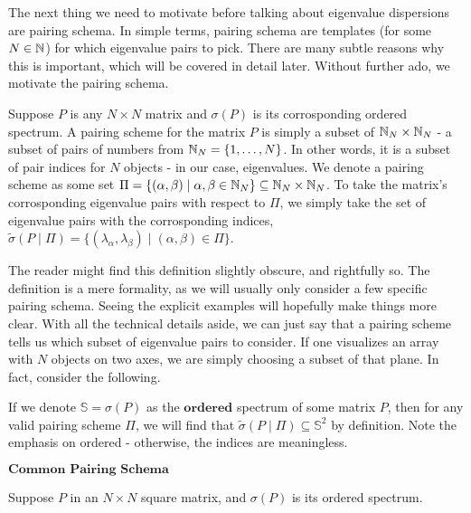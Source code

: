 The next thing we need to motivate before talking about eigenvalue dispersions are pairing schema. In simple terms, pairing schema are templates (for some $N \in \mathbb{N}$) for which eigenvalue pairs to pick. There are many subtle reasons why this is important, which will be covered in detail later. Without further ado, we motivate the pairing schema. 

\begin{definition}
Suppose $P$ is any $N \times N$ matrix and $\sigma(P)$ is its corrosponding ordered spectrum. A pairing scheme for the matrix $P$ is simply a subset of $\mathbb{N}_N \times \mathbb{N}_N$ - a subset of pairs of numbers from $\mathbb{N}_N = \{1, \dots, N\}$. In other words, it is a subset of pair indices for $N$ objects - in our case, eigenvalues. We denote a pairing scheme as some set $\Pi = \{(\alpha, \beta) \mid \alpha, \beta \in \mathbb{N}_N\} \subseteq \mathbb{N}_N \times \mathbb{N}_N$. To take the matrix's corrosponding eigenvalue pairs with respect to $\Pi$, we simply take the set of eigenvalue pairs with the corrosponding indices, $\tilde{\sigma}(P \mid \Pi) = \{(\lambda_{\alpha},\lambda_{\beta}) \mid ({\alpha},{\beta}) \in \Pi\}$.
\end{definition}

The reader might find this definition slightly obscure, and rightfully so. The definition is a mere formality, as we will usually only consider a few specific pairing schema. Seeing the explicit examples will hopefully make things more clear. With all the technical details aside, we can just say that a pairing scheme tells us which subset of eigenvalue pairs to consider. If one visualizes an array with $N$ objects on two axes, we are simply choosing a subset of that plane. In fact, consider the following.

\begin{remark} If we denote $\mathbb{S} = \sigma(P)$ as the $\textbf{ordered}$ spectrum of some matrix $P$, then for any valid pairing scheme $\Pi$, we will find that $\tilde{\sigma}(P \mid \Pi) \subseteq \mathbb{S}^2$ by definition. Note the emphasis on ordered - otherwise, the indices are meaningless.
\end{remark}


\newpage

\begin{center}
$\textbf{Common Pairing Schema}$
\end{center}

Suppose $P$ in an $N \times N$ square matrix, and $\sigma(P)$ is its ordered spectrum.

